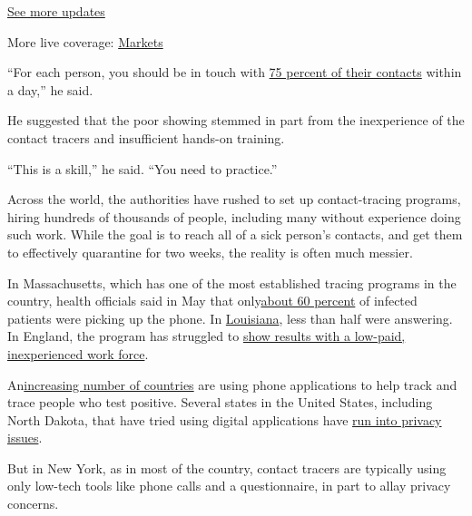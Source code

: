 \href{https://www.nytimes.com/2020/08/04/world/coronavirus-cases.html?action=click\&pgtype=Article\&state=default\&region=MAIN_CONTENT_1\&context=storylines_live_updates}{See
more updates}

More live coverage:
\href{https://www.nytimes.com/live/2020/08/04/business/stock-market-today-coronavirus?action=click\&pgtype=Article\&state=default\&region=MAIN_CONTENT_1\&context=storylines_live_updates}{Markets}

``For each person, you should be in touch with
\href{https://covidlocal.org/assets/documents/COVID\%20Local\%20Metrics\%20overview.pdf}{75
percent of their contacts} within a day,'' he said.

He suggested that the poor showing stemmed in part from the inexperience
of the contact tracers and insufficient hands-on training.

``This is a skill,'' he said. ``You need to practice.''

Across the world, the authorities have rushed to set up contact-tracing
programs, hiring hundreds of thousands of people, including many without
experience doing such work. While the goal is to reach all of a sick
person's contacts, and get them to effectively quarantine for two weeks,
the reality is often much messier.

In Massachusetts, which has one of the most established tracing programs
in the country, health officials said in May that
only\href{https://www.boston25news.com/news/health/more-than-60-percent-mass-contact-tracing-calls-answered/4NK2EEGVEVCDFBMICEKZXFCXR4/}{about
60 percent} of infected patients were picking up the phone. In
\href{https://www.governing.com/now/Louisiana-Struggles-to-Get-Contact-Tracer-Calls-Answered.html}{Louisiana},
less than half were answering. In England, the program has struggled to
\href{https://www.nytimes.com/2020/06/17/world/europe/uk-contact-tracing-coronavirus.html}{show
results with a low-paid, inexperienced work force}.

An\href{https://www.wsj.com/articles/coronavirus-contact-tracing-apps-launch-across-europe-amid-hopes-for-broad-adoption-11592319612}{increasing
number of countries} are using phone applications to help track and
trace people who test positive. Several states in the United States,
including North Dakota, that have tried using digital applications have
\href{https://www.washingtonpost.com/technology/2020/05/21/care19-dakota-privacy-coronavirus/}{run
into privacy issues}.

But in New York, as in most of the country, contact tracers are
typically using only low-tech tools like phone calls and a
questionnaire, in part to allay privacy concerns.

